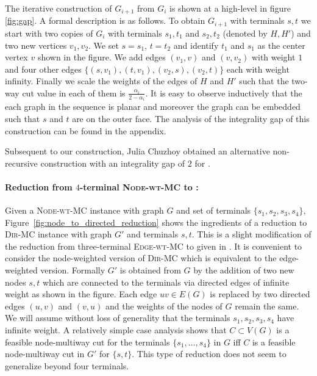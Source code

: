 \documentclass[11pt]{article}
\def\MC{\textsc{Edge-wt-MC}\xspace}
\def\DirMC{\textsc{Dir-MC}\xspace}
\def\2DirMC{\text{$st$-Bi-Cut}\xspace}
\def\NodeMC{\textsc{Node-wt-MC}\xspace}
\def\NodeMC{\textsc{Node-wt-MC}\xspace}
\begin{document}
The iterative construction of $G_{i+1}$ from $G_i$ is shown at a
high-level in figure \ref{fig:gap}. A formal description is as
follows. To obtain $G_{i+1}$ with terminals $s,t$ we start with two
copies of $G_i$ with terminals $s_1,t_1$ and $s_2,t_2$ (denoted 
by $H,H'$) and two new vertices $v_1,v_2$. We set $s=s_1$, $t=t_2$ and
identify $t_1$ and $s_1$ as the center vertex $v$ shown in the
figure. We add edges $(v_1,v)$ and $(v,v_2)$ with weight $1$ and four
other edges $\{(s,v_1),(t,v_1),(v_2,s),(v_2,t)\}$ each with weight
infinity. Finally we scale the weights of the edges of $H$ and $H'$
such that the two-way cut value in each of them is
$\frac{\alpha_i}{2-\alpha_i}$. It is easy to observe inductively that
the each graph in the sequence is planar and moreover the graph can be
embedded such that $s$ and $t$ are on the outer face.  The analysis of
the integrality gap of this construction can be found in the appendix.

Subsequent to our construction, Julia Chuzhoy obtained
an alternative non-recursive construction with an integrality gap of
$2$ for \2DirMC. 

\paragraph{Reduction from $4$-terminal \NodeMC to \2DirMC:} 
Given a \NodeMC instance with graph $G$ and set of terminals
$\{s_1,s_2,s_3,s_4\}$, Figure~\ref{fig:node_to_directed_reduction}
shows the ingredients of a reduction to \DirMC instance with graph
$G'$ and terminals $s,t$. This is a slight modification of the
reduction from three-terminal \MC to \2DirMC given in \cite{GargVY04}.
It is convenient to consider the node-weighted
version of \DirMC which is equivalent to the edge-weighted version.
Formally $G'$ is obtained from $G$ by the addition of two new nodes
$s,t$ which are connected to the terminals via directed edges of
infinite weight as shown in the figure. Each edge $uv \in E(G)$ is
replaced by two directed edges $(u,v)$ and $(v,u)$ and the weights of
the nodes of $G$ remain the same. We will assume without loss of generality
that the terminals $s_1,s_2,s_3,s_4$ have infinite weight.
A relatively simple case analysis shows that 
$C \subset V(G)$ is a feasible node-multiway cut for the terminals
$\{s_1,\ldots,s_4\}$ in $G$ iff $C$ is a feasible node-multiway cut in 
$G'$ for $\{s,t\}$. This type of reduction does not seem to generalize
beyond four terminals.
\end{document}
